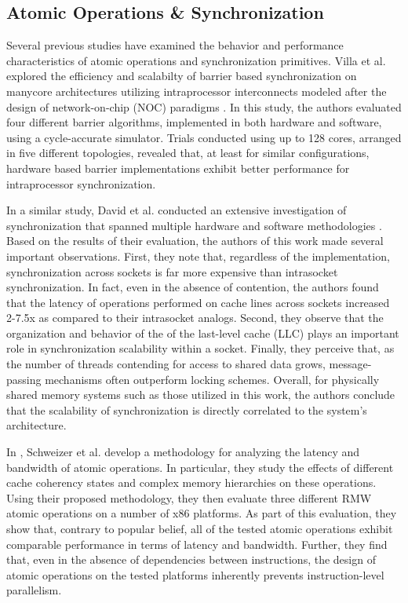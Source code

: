 

\subsection{Atomic Operations \& Synchronization}
\label{subsec:amos_sync}

Several previous studies have examined the behavior and performance characteristics of atomic operations and synchronization primitives.
Villa et al. explored the efficiency and scalabilty of barrier based synchronization on manycore architectures utilizing intraprocessor interconnects modeled after the design of network-on-chip (NOC) paradigms \cite{villa2008barriers}.
In this study, the authors evaluated four different barrier algorithms, implemented in both hardware and software, using a cycle-accurate simulator.
Trials conducted using up to 128 cores, arranged in five different topologies, revealed that, at least for similar configurations, hardware based barrier implementations exhibit better performance for intraprocessor synchronization.

In a similar study, David et al. conducted an extensive investigation of synchronization that spanned multiple hardware and software methodologies \cite{david2013sync}.
Based on the results of their evaluation, the authors of this work made several important observations.
First, they note that, regardless of the implementation, synchronization across sockets is far more expensive than intrasocket synchronization.
In fact, even in the absence of contention, the authors found that the latency of operations performed on cache lines across sockets increased 2-7.5x as compared to their intrasocket analogs.
Second, they observe that the organization and behavior of the of the last-level cache (LLC) plays an important role in synchronization scalability within a socket.
Finally, they perceive that, as the number of threads contending for access to shared data grows, message-passing mechanisms often outperform locking schemes.
Overall, for physically shared memory systems such as those utilized in this work, the authors conclude that the scalability of synchronization is directly correlated to the system's architecture.

In \cite{schweizer2015evaluating}, Schweizer et al. develop a methodology for analyzing the latency and bandwidth of atomic operations.
In particular, they study the effects of different cache coherency states and complex memory hierarchies on these operations.
Using their proposed methodology, they then evaluate three different RMW atomic operations on a number of x86 platforms.
As part of this evaluation, they show that, contrary to popular belief, all of the tested atomic operations exhibit comparable performance in terms of latency and bandwidth.
Further, they find that, even in the absence of dependencies between instructions, the design of atomic operations on the tested platforms inherently prevents instruction-level parallelism.

